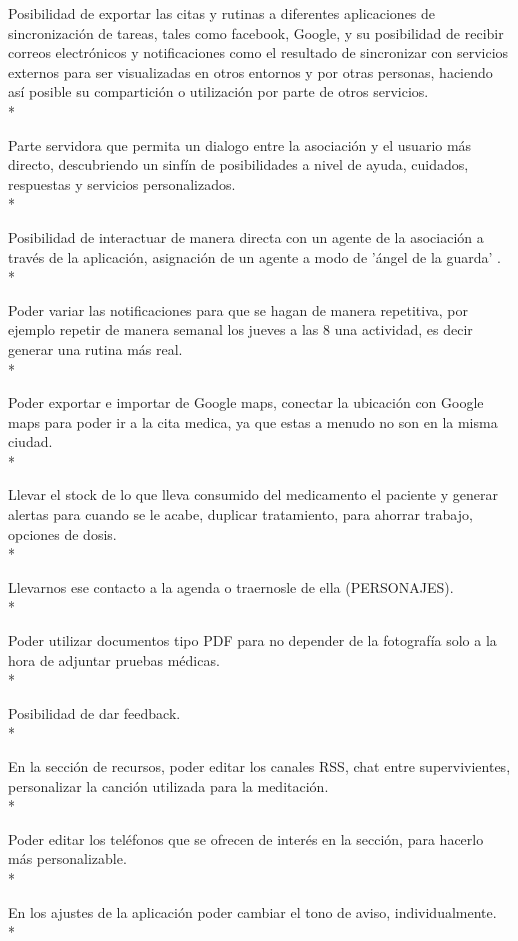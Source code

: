 \documentclass[../pfc.tex]{subfiles}
\begin{document}
	Posibilidad de exportar las citas y rutinas a diferentes aplicaciones de sincronización de tareas, tales como facebook, Google, y su posibilidad de recibir correos electrónicos y notificaciones como el resultado de sincronizar con servicios externos para ser visualizadas en otros entornos y por otras personas, haciendo así posible su compartición o utilización por parte de otros servicios.\\*
	
	Parte servidora que permita un dialogo entre la asociación y el usuario más directo, descubriendo un sinfín de posibilidades a nivel de ayuda, cuidados, respuestas y servicios personalizados.\\*
	
	Posibilidad de interactuar de manera directa con un agente de la asociación a través de la aplicación, asignación de un agente a modo de 'ángel de la guarda' .\\*
	
	Poder variar las notificaciones para que se hagan de manera repetitiva, por ejemplo repetir de manera semanal los jueves a las 8 una actividad, es decir generar una rutina más real. \\*
	
	Poder exportar e importar de Google maps, conectar la ubicación con Google maps para poder ir a la cita medica, ya que estas a menudo no son en la misma ciudad.\\*
	
	Llevar el stock de lo que lleva consumido del medicamento el paciente y generar alertas para cuando se le acabe, duplicar tratamiento, para ahorrar trabajo, opciones de dosis.\\*
	
	Llevarnos ese contacto a la agenda o traernosle de ella (PERSONAJES).\\*
	
	Poder utilizar documentos tipo PDF para no depender de la fotografía solo a la hora de adjuntar pruebas médicas.\\*
	
	Posibilidad de dar feedback.\\*
	
	En la sección de recursos, poder editar los canales RSS, chat entre supervivientes, personalizar la canción utilizada para la meditación.\\*
	
	Poder editar los teléfonos que se ofrecen de interés en la sección, para hacerlo más personalizable.\\*
	
	En los ajustes de la aplicación poder cambiar el tono de aviso, individualmente.\\* 
	
	
		
	
	


	

	
\end{document}
